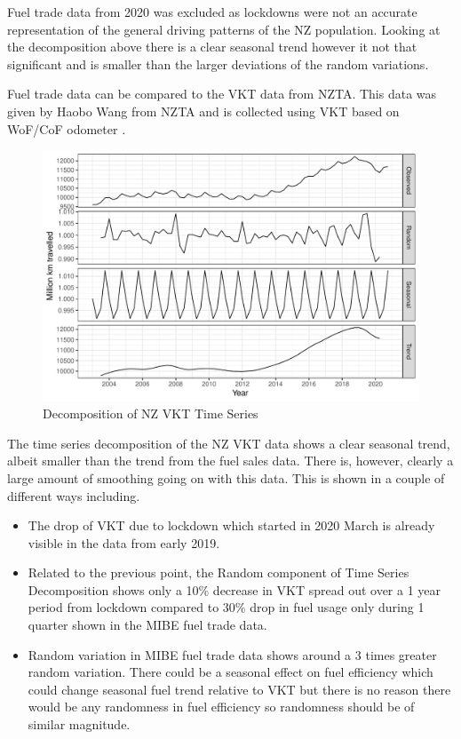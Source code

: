 \documentclass[
]{article}
\begin{document}
Fuel trade data from 2020 was excluded as lockdowns were not an accurate
representation of the general driving patterns of the NZ population.
Looking at the decomposition above there is a clear seasonal trend
however it not that significant and is smaller than the larger
deviations of the random variations.

Fuel trade data can be compared to the VKT data from NZTA. This data was
given by Haobo Wang from NZTA and is collected using VKT based on
WoF/CoF odometer \cite{NZTA_VKT}.

\begin{figure}
\centering
\includegraphics{summary_week4_files/figure-latex/VKT_ts-1.pdf}
\caption{Decomposition of NZ VKT Time Series}
\end{figure}

The time series decomposition of the NZ VKT data shows a clear seasonal
trend, albeit smaller than the trend from the fuel sales data. There is,
however, clearly a large amount of smoothing going on with this data.
This is shown in a couple of different ways including.

\begin{itemize}
\item The drop of VKT due to lockdown which started in 2020 March is already visible in the data from early 2019. 
\item Related to the previous point, the Random component of Time Series Decomposition shows only a 10\% decrease in VKT spread out over a 1 year period from lockdown compared to 30\% drop in fuel usage only during 1 quarter shown in the MIBE fuel trade data. 
\item Random variation in MIBE fuel trade data shows around a 3 times greater random variation. There could be a seasonal effect on fuel efficiency which could change seasonal fuel trend relative to VKT but there is no reason there would be any randomness in fuel efficiency so randomness should be of similar magnitude.
\end{itemize}
\end{document}
